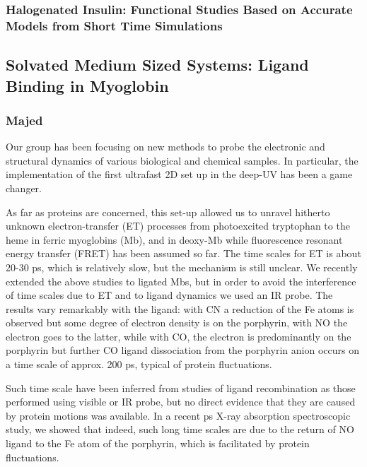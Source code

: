 \documentclass[journal=jacsat,manuscript=article]{achemso}
\begin{document}
\subsubsection{Halogenated Insulin: Functional Studies Based on Accurate Models from Short Time Simulations}



\subsection{Solvated Medium Sized Systems: Ligand Binding in Myoglobin}
\subsubsection{Majed}
Our group has been focusing on new methods to probe the electronic and
structural dynamics of various biological and chemical samples. In
particular, the implementation of the first ultrafast 2D set up in the
deep-UV has been a game changer.\cite{aubock:2012,aubock2:2012}

As far as proteins are concerned, this set-up allowed us to unravel
hitherto unknown electron-transfer (ET) processes from photoexcited
tryptophan to the heme in ferric myoglobins (Mb),\cite{consani:2013}
and in deoxy-Mb\cite{monni:2015} while fluorescence resonant energy
transfer (FRET) has been assumed so far. The time scales for ET is
about 20-30 ps, which is relatively slow, but the mechanism is still
unclear. We recently extended the above studies to ligated Mbs, but in
order to avoid the interference of time scales due to ET and to ligand
dynamics we used an IR probe. The results vary remarkably with the
ligand: with CN a reduction of the Fe atoms is observed but some
degree of electron density is on the porphyrin, with NO the electron
goes to the latter, while with CO, the electron is predominantly on
the porphyrin but further CO ligand dissociation from the porphyrin
anion occurs on a time scale of approx. 200 ps, typical of protein
fluctuations.\cite{monni:prep}

Such time scale have been inferred from studies of ligand
recombination as those performed using visible or IR probe, but no
direct evidence that they are caused by protein motions was
available. In a recent ps X-ray absorption spectroscopic study, we
showed that indeed, such long time scales are due to the return of NO
ligand to the Fe atom of the porphyrin,\cite{silatani:2015} which is
facilitated by protein fluctuations.
\end{document}
